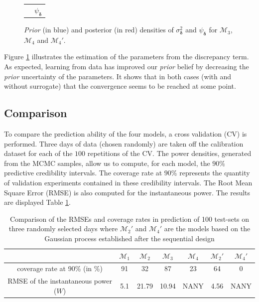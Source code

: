 \documentclass[soumission]{jsfds}
\begin{document}
\begin{figure}[htbp!]
\begin{center}
\begin{tabular}{cccc}
	&\multicolumn{3}{c}{$\psi_{\boldsymbol{\delta}}$}\\
  \end{tabular}   
\caption{\textit{Prior} (in blue) and posterior (in red) densities of $\sigma_{\boldsymbol{\delta}}^2$ and $\psi_{\boldsymbol{\delta}}$ for $\mathcal{M}_3$, $\mathcal{M}_4$ and $\mathcal{M}_4'$.}
\label{fig:comparisionDensities2}
\end{center}
\end{figure}

Figure \ref{fig:comparisionDensities2} illustrates the estimation of the parameters from the discrepancy term.
As expected, learning from data has improved our \textit{prior} belief by decreasing the \textit{prior} uncertainty of the parameters. 
It shows that in both cases (with and without surrogate) that the convergence seems to be reached at some point. \newline

\subsection{Comparison}

To compare the prediction ability of the four models,
a cross validation (CV) is performed.
Three days of data (chosen randomly) are taken off the calibration dataset for each of the $100$ repetitions of the CV. 
The power densities, generated from the MCMC samples, allow us to compute, for each model, the $90\%$ predictive credibility intervals. 
The coverage rate at $90\%$ represents the quantity of validation experiments contained in these credibility intervals.
The Root Mean Square Error (RMSE) is also computed for the instantaneous power. The results are displayed Table 
\ref{tab:comparison}.\newline

\begin{table}[htbp!]
\centering
\caption{Comparison of the RMSEs and coverage rates in prediction of 100 test-sets on three randomly selected days where $\mathcal{M}_2'$ and $\mathcal{M}_4'$ are the models based on the Gaussian process established after the sequential design}
\label{tab:comparison}
\begin{tabular}{c|c|c|c|c|c|c}

& $\mathcal{M}_1$ & $\mathcal{M}_2$ & $\mathcal{M}_3$ & $\mathcal{M}_4$ & $\mathcal{M}_2'$&  $\mathcal{M}_4'$ \\
\hline
\hline
coverage rate at 90\% (in \%) & 91 & 32 & 87 & 23 & 64 & 0 \\
\hline
RMSE of the instantaneous power ($W$) & 5.1 & 21.79 & 10.94 & NANY & 4.56 & NANY \\
\end{tabular}
\end{table}
\end{document}
